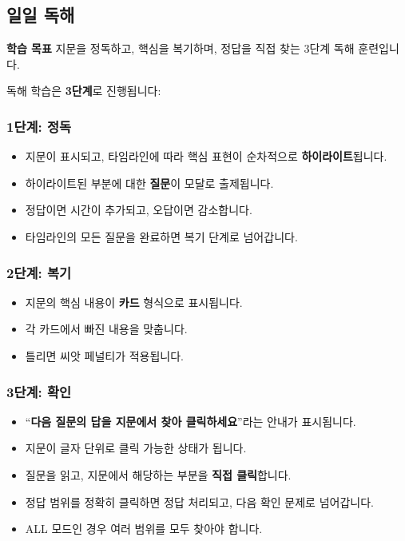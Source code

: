 \documentclass[11pt,a4paper]{article}
\newcommand{\goalbox}[1]{%
  \vspace{0.3cm}
  \noindent\colorbox{lightbg}{\parbox{\dimexpr\textwidth-2\fboxsep}{%
    \textbf{\color{korfarm}학습 목표} \quad #1%
  }}
  \vspace{0.3cm}
}
\begin{document}
\subsection{일일 독해}
\goalbox{지문을 정독하고, 핵심을 복기하며, 정답을 직접 찾는 3단계 독해 훈련입니다.}

독해 학습은 \textbf{3단계}로 진행됩니다:

\subsubsection{1단계: 정독}
\begin{itemize}[nosep,leftmargin=*]
  \item 지문이 표시되고, 타임라인에 따라 핵심 표현이 순차적으로 \textbf{하이라이트}됩니다.
  \item 하이라이트된 부분에 대한 \textbf{질문}이 모달로 출제됩니다.
  \item 정답이면 시간이 추가되고, 오답이면 감소합니다.
  \item 타임라인의 모든 질문을 완료하면 복기 단계로 넘어갑니다.
\end{itemize}

\subsubsection{2단계: 복기}
\begin{itemize}[nosep,leftmargin=*]
  \item 지문의 핵심 내용이 \textbf{카드} 형식으로 표시됩니다.
  \item 각 카드에서 빠진 내용을 맞춥니다.
  \item 틀리면 씨앗 페널티가 적용됩니다.
\end{itemize}

\subsubsection{3단계: 확인}
\begin{itemize}[nosep,leftmargin=*]
  \item ``\textbf{다음 질문의 답을 지문에서 찾아 클릭하세요}''라는 안내가 표시됩니다.
  \item 지문이 글자 단위로 클릭 가능한 상태가 됩니다.
  \item 질문을 읽고, 지문에서 해당하는 부분을 \textbf{직접 클릭}합니다.
  \item 정답 범위를 정확히 클릭하면 정답 처리되고, 다음 확인 문제로 넘어갑니다.
  \item ALL 모드인 경우 여러 범위를 모두 찾아야 합니다.
\end{itemize}
\end{document}
